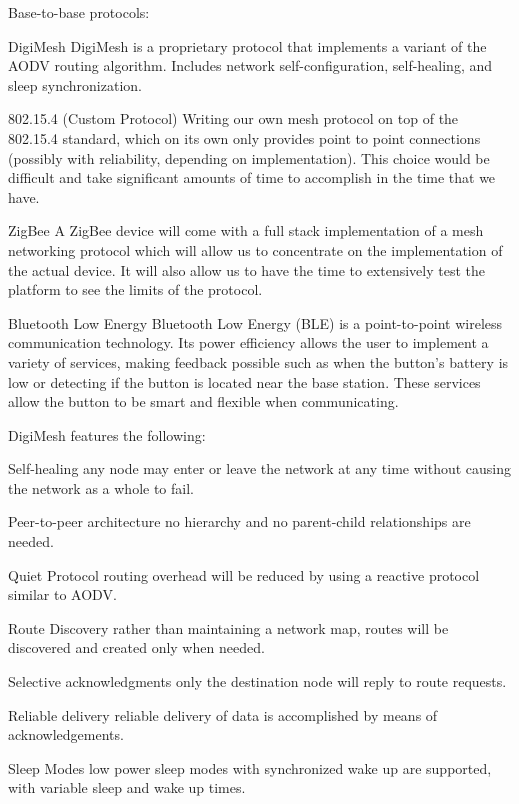 \documentclass[journal]{IEEEtran}
\begin{document}
Base-to-base protocols:
\begin{LaTeXdescription}
  \item [DigiMesh] DigiMesh is a proprietary protocol that implements a variant of the AODV routing algorithm. Includes network self-configuration, self-healing, and sleep synchronization.
  \item [802.15.4  (Custom Protocol)] Writing our own mesh protocol on top of the 802.15.4 standard, which on its own only provides point to point connections (possibly with reliability, depending on implementation). This choice would be difficult and take significant amounts of time to accomplish in the time that we have.
  \item [ZigBee] A ZigBee device will come with a full stack implementation of a mesh networking protocol which will allow us to concentrate on the implementation of the actual device. It will also allow us to have the time to extensively test the platform to see the limits of the protocol.
  \item [Bluetooth Low Energy] Bluetooth Low Energy (BLE) is a point-to-point wireless communication technology.  Its power efficiency allows the user to implement a variety of services, making feedback possible such as when the button’s battery is low or detecting if the button is located near the base station.  These services allow the button to be smart and flexible when communicating.
\end{LaTeXdescription}

DigiMesh features the following:
\begin{LaTeXdescription}
  \item[Self-healing] any node may enter or leave the network at any time without causing the network as a whole to fail.
  \item[Peer-to-peer architecture] no hierarchy and no parent-child relationships are needed.
  \item[Quiet Protocol] routing overhead will be reduced by using a reactive protocol similar to AODV.
  \item[Route Discovery] rather than maintaining a network map, routes will be discovered and created only when needed.
  \item[Selective acknowledgments] only the destination node will reply to route requests.
  \item[Reliable delivery] reliable delivery of data is accomplished by means of acknowledgements.
  \item[Sleep Modes] low power sleep modes with synchronized wake up are supported, with variable sleep and wake up times.
\end{LaTeXdescription}
\end{document}
